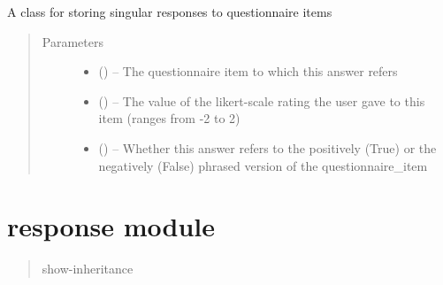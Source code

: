 \documentclass[letterpaper,10pt,english]{sphinxmanual}
\begin{document}
\begin{fulllineitems}
\label{\detokenize{questionnaire_response:questionnaire_response.QuestionnaireResponse}}
A class for storing singular responses to questionnaire items
\begin{quote}\begin{description}
\item[{Parameters}] \leavevmode\begin{itemize}
\item {} 
 ({\hyperref[\detokenize{questionnaire_item:questionnaire_item.QuestionnaireItem}]{}}) -- The questionnaire item to which this answer refers

\item {} 
 () -- The value of the likert-scale rating the user gave to this item (ranges from -2 to 2)

\item {} 
 () -- Whether this answer refers to the positively (True) or the negatively (False) phrased version of the questionnaire\_item

\end{itemize}

\end{description}\end{quote}

\end{fulllineitems}



\chapter{response module}
\label{\detokenize{response:response-module}}\label{\detokenize{response::doc}}\label{\detokenize{response:module-response}}\begin{quote}\begin{description}
\item[{show-inheritance}] \leavevmode
\end{description}\end{quote}
\end{document}
